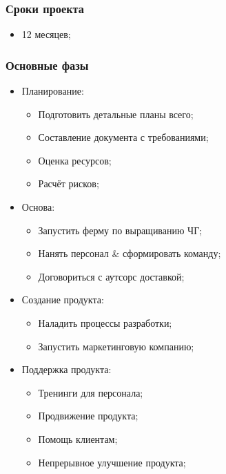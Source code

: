 \documentclass[a4paper,10pt]{article}
\begin{document}
\subsubsection{Сроки проекта}

    \begin{itemize}
        \item 12 месяцев;
    \end{itemize}

\subsubsection{Основные фазы}



    \begin{itemize}
        \item Планирование:
            \begin{itemize}
                \item Подготовить детальные планы всего;
                \item Составление документа с требованиями;
                \item Оценка ресурсов;
                \item Расчёт рисков;
            \end{itemize}
        \item Основа:
            \begin{itemize}
                \item Запустить ферму по выращиванию ЧГ;
                \item Нанять персонал \& сформировать команду;
                \item Договориться с аутсорс доставкой;
            \end{itemize}
        \item Создание продукта:
            \begin{itemize}
                \item Наладить процессы разработки;
                \item Запустить маркетинговую компанию;
            \end{itemize}
        \item Поддержка продукта:
            \begin{itemize}
                \item Тренинги для персонала;
                \item Продвижение продукта;
                \item Помощь клиентам;
                \item Непрерывное улучшение продукта;
            \end{itemize}
    \end{itemize}
\end{document}
